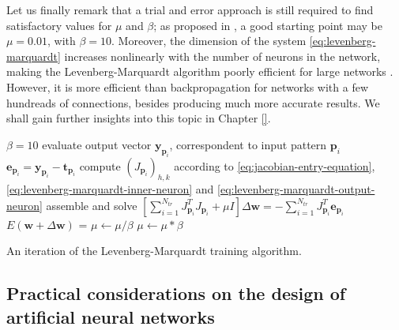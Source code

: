 \documentclass[12pt, a4paper, twoside, openright]{report}
\numberwithin{equation}{chapter}
\theoremstyle{theorem}
\theoremstyle{definition}
\theoremstyle{remark}
\theoremstyle{proposition}
\numberwithin{figure}{chapter}
\begin{document}
		Let us finally remark that a trial and error approach is still required to find satisfactory values for $\mu$ and $\beta$; as proposed in \cite{Mar63}, a good starting point may be $\mu = 0.01$, with $\beta = 10$. Moreover, the dimension of the system \eqref{eq:levenberg-marquardt} increases nonlinearly with the number of neurons in the network, making the Levenberg-Marquardt algorithm poorly efficient for large networks \cite{Hag94}. However, it is more efficient than backpropagation for networks with a few hundreads of connections, besides producing much more accurate results. We shall gain further insights into this topic in Chapter \ref{}.
		
		\begin{algorithm}[H]
			\begin{algorithmic}[1]
					\State $\beta = 10$
						\State evaluate output vector $\mathbf{y}_{\mathbf{p}_i}$, correspondent to input pattern $\mathbf{p}_i$
						\State $\mathbf{e}_{\mathbf{p}_i} = \mathbf{y}_{\mathbf{p}_i} - \mathbf{t}_{\mathbf{p}_i}$
							\State compute $\left( J_{\mathbf{p}_i} \right)_{h,k}$ according to \eqref{eq:jacobian-entry-equation}, \eqref{eq:levenberg-marquardt-inner-neuron} and \eqref{eq:levenberg-marquardt-output-neuron} 
						\EndFor
					\EndFor
					\State assemble and solve $\left[ \sum_{i = 1}^{N_{tr}} J_{\mathbf{p}_i}^T J_{\mathbf{p}_i} + \mu I \right] \Delta \mathbf{w} = - \sum_{i = 1}^{N_{tr}} J_{\mathbf{p}_i}^T \mathbf{e}_{\mathbf{p}_i}$
					\State $E(\mathbf{w} + \Delta \mathbf{w})$ = 
						\State $\mu \leftarrow \mu / \beta$
					\Else
						\State $\mu \leftarrow \mu * \beta$
					\EndIf 
				\EndFunction
			\end{algorithmic}
			
			\caption{An iteration of the Levenberg-Marquardt training algorithm.}
			\label{alg:levenberg-marquart}
		\end{algorithm}
						
	\subsection{Practical considerations on the design of artificial neural networks}
	\label{section:Practical considerations on the design of artificial neural networks}
	
\end{document}
